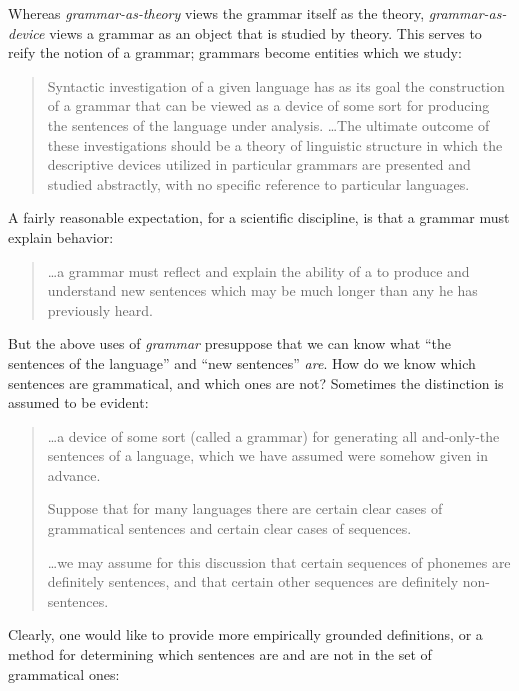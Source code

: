   Whereas \textit{grammar-as-theory} views the grammar itself as the theory, \textit{grammar-as-device} views a grammar as an object that is studied by theory. This serves to reify the notion of a grammar; grammars become entities which we study:

\begin{quote}
Syntactic investigation of a given language has as its goal the construction of a grammar that can be viewed as a device of some sort for producing the sentences of the language under analysis. …The ultimate outcome of these investigations should be a theory of linguistic structure in which the descriptive devices utilized in particular grammars are presented and studied abstractly, with no specific reference to particular languages. \citep[11]{Chomsky1957}
\end{quote}

A fairly reasonable expectation, for a scientific discipline, is that a grammar must explain behavior:

\begin{quote}
…a grammar must reflect and explain the ability of a  to produce and understand new sentences which may be much longer than any he has previously heard. \citep[124]{Chomsky1956}
\end{quote}

  But the above uses of \textit{grammar} presuppose that we can know what “the sentences of the language” and “new sentences” \textit{are}. How do we know which sentences are grammatical, and which ones are not? Sometimes the distinction is assumed to be evident:

\begin{quote}
…a device of some sort (called a grammar) for generating all and-only-the sentences of a language, which we have assumed were somehow given in advance. \citep[85]{Chomsky1957}

Suppose that for many languages there are certain clear cases of grammatical sentences and certain clear cases of  sequences. \citep[113]{Chomsky1956}

…we may assume for this discussion that certain sequences of phonemes are definitely sentences, and that certain other sequences are definitely non-sentences. \citep[14]{Chomsky1957}
\end{quote}

Clearly, one would like to provide more empirically grounded definitions, or a method for determining which sentences are and are not in the set of grammatical ones:

